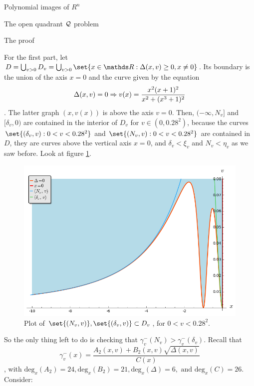 \documentclass[11pt, a4paper, english, twoside, notitlepage]{report}
\begin{document}
\begin{chapter}{Polynomial images of $R^n$}
\begin{section}{The open quadrant $\mathcal{Q}$ problem}
\begin{subsection}{The proof}
\begin{Proof}
			
			For the first part, let $D=\bigcup_{v>0} D_v=\bigcup_{v>0}\set{x\in \R: \Delta(x,v)\geq 0,x\neq 0}$. Its boundary is the union of the axis $x=0$ and the curve given by the equation 
			$$
			\Delta(x, v) = 0 \Rightarrow v(x)=\frac{x^2(x+1)^2}{x^2+(x^3+1)^2}
			$$
			. The latter graph $\left(x, v(x)\right)$ is above the axis $v = 0$. Then, $(-\infty, N_v]$ and $[\delta_v, 0)$ are contained in the interior of $D_v$ for $v\in (0, 0.28^2)$, because the curves $\set{(\delta_v, v): 0 < v < 0.28^2}$ and $\set{(N_v, v): 0 < v < 0.28^2}$ are contained in $D$, they are curves above the vertical axis $x = 0$, and $\delta_v < \xi_v$ and $N_v < \eta_v$ as we saw before. Look at figure \ref{fig:nice_plot}.
			
			\begin{figure}[h]
				\centering
				\includegraphics[width=1\textwidth]{plots/ch1_15_nice_plot.png}
				\caption{Plot of $\set{(N_v, v)}, \set{(\delta_v, v)} \subset D_v$, for $0 < v < 0.28^2$.\label{fig:nice_plot}}
			\end{figure}
			
			So the only thing left to do is checking that $\gamma_v^-(N_v) > \gamma_v^-(\delta_v)$. Recall that 
			$$\gamma_v^-(x)=\dfrac{A_2(x,v)+B_2(x,v)\sqrt{\Delta(x,v)}}{C(x)}$$
			, with $\text{deg}_x(A_2) = 24, \text{deg}_x(B_2) = 21, \text{deg}_x(\Delta) = 6, \text{ and deg}_x(C) = 26$. Consider:
			

\end{Proof}
\end{subsection}
\end{section}
\end{chapter}
\end{document}
